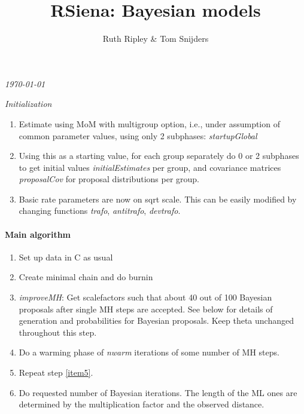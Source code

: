 \documentclass[12pt,a4paper]{article}
\renewcommand{\=}{\,=\,}
\newcommand{\+}{\,+\,}
\newcommand{\nnm}[1]{\textsf{\small\textit{#1}}}
\begin{document}
\title{RSiena: Bayesian models}
\author{Ruth Ripley \& Tom Snijders}
\date{}
\maketitle

\centerline{\emph{\today}}
\bigskip
\emph{Initialization}
\begin{enumerate}
\item Estimate using MoM with multigroup option, i.e., under assumption
    of common parameter values, using only 2 subphases: \nnm{startupGlobal}
\item Using this as a starting value, for each group separately
    do 0 or 2 subphases to get initial values \nnm{initialEstimates} per group,
    and covariance matrices \nnm{proposalCov} for proposal distributions
    per group.
\item Basic rate parameters are now on sqrt scale. This can be easily modified
    by changing functions \nnm{trafo}, \nnm{antitrafo}, \nnm{devtrafo}.
\end{enumerate}
\paragraph{Main algorithm}
\begin{enumerate}
  \item Set up data in C as usual
  \item Create minimal chain and do burnin
  \item \nnm{improveMH}: Get scalefactors such that about 40 out of 100
  Bayesian proposals after single MH steps are accepted.
  See below for details of
      generation and probabilities for Bayesian proposals. Keep theta
      unchanged throughout this step. \label{item5}
\item Do a warming phase of \nnm{nwarm} iterations of some number of MH steps.
\item Repeat step \ref{item5}.
\item Do requested number of Bayesian iterations. The
  length of the ML ones are determined by the multiplication factor and the
  observed distance.
\end{enumerate}
\end{document}
